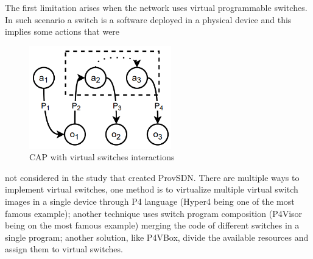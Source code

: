The first limitation arises when the network uses virtual programmable switches. In such scenario a switch is a software deployed in a physical device and this implies some actions that were
\begin{figure}
\caption{CAP with virtual switches interactions}
\label{fig:vcap}
\includegraphics[width=0.55\textwidth]{resources/Chapter-1/v-cap.png}
\end{figure}
not considered in the study that created ProvSDN. 
There are multiple ways to implement virtual switches, one method is to virtualize multiple virtual switch images in a single device through P4 language (Hyper4 being one of the most famous example); another technique uses switch program composition (P4Visor being on the most famous example) merging the code of different switches in a single program; another solution, like P4VBox, divide the available resources and assign them to virtual switches. 

